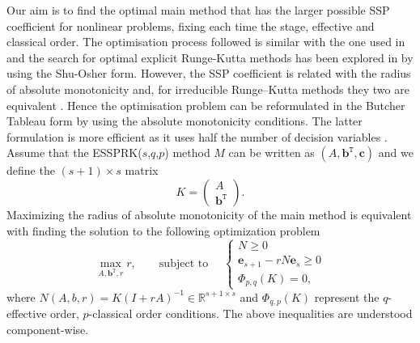 \qquad Our aim is to find the optimal main method that has the larger possible SSP coefficient for nonlinear problems, fixing each time the stage, effective and classical order. The optimisation process followed is similar with the one used in \cite{Ketcheson2008, Ketcheson2009} and the search for optimal explicit Runge-Kutta methods has been explored in \cite{Gottlieb1998, Gottlieb2001, Spiteri2003a, Spiteri2003b, Ruuth2004} by using the Shu-Osher form.
However, the SSP coefficient is related with the radius of absolute monotonicity \cite{Kraaijevanger1991} and, for irreducible Runge--Kutta methods they two are equivalent \cite{Ferracina2004, Higueras2004}.
Hence the optimisation problem can be reformulated in the Butcher Tableau form by using the absolute monotonicity conditions. The latter formulation is more efficient as it uses half the number of decision variables \cite{Ketcheson2008}. Assume that the ESSPRK(\( s \),\( q \),\( p \)) method \( M \) can be written as \( (A,\bm{b}^{\texttt{T}},\bm{c}) \) and we define the \( (s+1) \times s \) matrix
\begin{equation}\label{eq3.1}
    K = \left(
            \begin{array}{c}
                     A              \\
                     \textbf{b}^{\texttt{T}}
            \end{array}
         \right).
\end{equation}
Maximizing the radius of absolute monotonicity of the main method is equivalent with finding the solution to the following optimization problem
\begin{equation}\label{eq3.2}
    \max_{A, \bm{b}^{\texttt{T}}, r} r, \qquad \text{subject to } \quad \left\{
                                                 \begin{array}{ll}
                                                   N \geq 0 \\
                                                   \textbf{e}_{s+1} - rN\textbf{e}_{s} \geq 0 \\
                                                   \Phi_{p,q}(K) = 0,
                                                 \end{array}
                                               \right.
\end{equation}
where \( N(A,b,r) = K(I + rA)^{-1} \in \mathbb{R}^{s+1 \times s}\) and \( \Phi_{q,p}(K) \) represent the \( q \)-effective order, \( p \)-classical order conditions. The above inequalities are understood component-wise.

